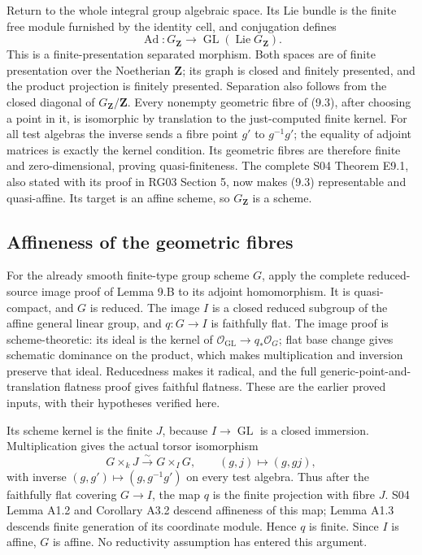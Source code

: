 \documentclass[11pt,a4paper,openany]{report}
\newcounter{none}
\begin{document}
Return to the whole integral group algebraic space. Its Lie bundle is the finite free module furnished by the identity cell, and conjugation defines \[
\operatorname{Ad}:G_{\mathbf Z}\longrightarrow
 \operatorname{GL}(\operatorname{Lie}G_{\mathbf Z}).
\tag{9.3}
\] This is a finite-presentation separated morphism. Both spaces are of finite presentation over the Noetherian \(\mathbf Z\); its graph is closed and finitely presented, and the product projection is finitely presented. Separation also follows from the closed diagonal of \(G_{\mathbf Z}/\mathbf Z\). Every nonempty geometric fibre of (9.3), after choosing a point in it, is isomorphic by translation to the just-computed finite kernel. For all test algebras the inverse sends a fibre point \(g'\) to \(g^{-1}g'\); the equality of adjoint matrices is exactly the kernel condition. Its geometric fibres are therefore finite and zero-dimensional, proving quasi-finiteness. The complete S04 Theorem E9.1, also stated with its proof in RG03 Section 5, now makes (9.3) representable and quasi-affine. Its target is an affine scheme, so \(G_{\mathbf Z}\) is a scheme.

\subsection{Affineness of the geometric fibres}\label{AG-RG-05-affineness-of-the-geometric-fibres}

For the already smooth finite-type group scheme \(G\), apply the complete reduced-source image proof of Lemma 9.B to its adjoint homomorphism. It is quasi-compact, and \(G\) is reduced. The image \(I\) is a closed reduced subgroup of the affine general linear group, and \(q:G\to I\) is faithfully flat. The image proof is scheme-theoretic: its ideal is the kernel of \(\mathcal O_{\operatorname{GL}}\to q_*\mathcal O_G\); flat base change gives schematic dominance on the product, which makes multiplication and inversion preserve that ideal. Reducedness makes it radical, and the full generic-point-and-translation flatness proof gives faithful flatness. These are the earlier proved inputs, with their hypotheses verified here.

Its scheme kernel is the finite \(J\), because \(I\to\operatorname{GL}\) is a closed immersion. Multiplication gives the actual torsor isomorphism \[
G\times_kJ\xrightarrow{\sim}G\times_I G,\qquad
(g,j)\longmapsto(g,gj),
\] with inverse \((g,g')\mapsto(g,g^{-1}g')\) on every test algebra. Thus after the faithfully flat covering \(G\to I\), the map \(q\) is the finite projection with fibre \(J\). S04 Lemma A1.2 and Corollary A3.2 descend affineness of this map; Lemma A1.3 descends finite generation of its coordinate module. Hence \(q\) is finite. Since \(I\) is affine, \(G\) is affine. No reductivity assumption has entered this argument.
\end{document}

